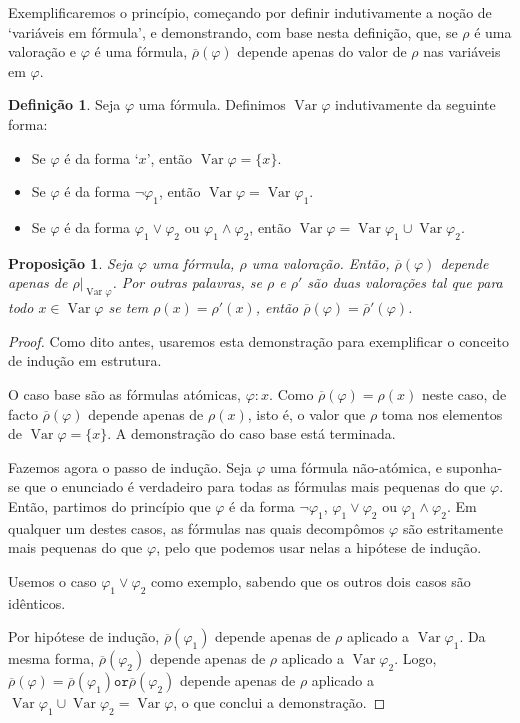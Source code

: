 \documentclass{report}
\newtheorem*{prop*}{Proposição}
\theoremstyle{definition}
\newtheorem*{definicao*}{Definição}
\theoremstyle{remark}
\DeclareMathOperator{\var}{Var}
\newcommand{\por}{\mathbin{\texttt{or}}}
\begin{document}
	Exemplificaremos o princípio, começando por definir indutivamente a noção de `variáveis em fórmula', e demonstrando, com base nesta definição, que, se $\rho$ é uma valoração e $\varphi$ é uma fórmula, $\overline\rho(\varphi)$ depende apenas do valor de $\rho$ nas variáveis em $\varphi$.
	
	\begin{definicao*}
	Seja $\varphi$ uma fórmula. Definimos $\var \varphi$ indutivamente da seguinte forma:
	\begin{itemize}
	\item Se $\varphi$ é da forma `$x$', então $\var \varphi = \{x\}$.
	
	\item Se $\varphi$ é da forma $\neg \varphi_1$, então $\var \varphi = \var \varphi_1$.
	
	\item Se $\varphi$ é da forma $\varphi_1 \lor \varphi_2$ ou $\varphi_1 \land \varphi_2$, então $\var \varphi = \var \varphi_1 \cup \var \varphi_2$.
	\end{itemize}
	\end{definicao*}
	
	\begin{prop*}
	Seja $\varphi$ uma fórmula, $\rho$ uma valoração. Então, $\overline \rho(\varphi)$ depende apenas de $\rho|_{\var \varphi}$. Por outras palavras, se $\rho$ e $\rho'$ são duas valorações tal que para todo $x \in \var \varphi$ se tem $\rho(x) = \rho'(x)$, então $\overline \rho(\varphi) = \overline \rho'(\varphi)$.
	\end{prop*}
	
	\begin{proof}
	Como dito antes, usaremos esta demonstração para exemplificar o conceito de indução em estrutura.
	
	O caso base são as fórmulas atómicas, $\varphi : x$. Como $\overline\rho(\varphi) = \rho(x)$ neste caso, de facto $\overline\rho(\varphi)$ depende apenas de $\rho(x)$, isto é, o valor que $\rho$ toma nos elementos de $\var \varphi = \{x\}$. A demonstração do caso base está terminada.
	
	Fazemos agora o passo de indução. Seja $\varphi$ uma fórmula não-atómica, e suponha-se que o enunciado é verdadeiro para todas as fórmulas mais pequenas do que $\varphi$. Então, partimos do princípio que $\varphi$ é da forma $\neg \varphi_1$, $\varphi_1 \lor \varphi_2$ ou $\varphi_1 \land \varphi_2$. Em qualquer um destes casos, as fórmulas nas quais decompômos $\varphi$ são estritamente mais pequenas do que $\varphi$, pelo que podemos usar nelas a hipótese de indução.
	
	Usemos o caso $\varphi_1 \lor \varphi_2$ como exemplo, sabendo que os outros dois casos são idênticos.
	
	Por hipótese de indução, $\overline\rho(\varphi_1)$ depende apenas de $\rho$ aplicado a $\var \varphi_1$. Da mesma forma, $\overline\rho(\varphi_2)$ depende apenas de $\rho$ aplicado a $\var \varphi_2$. Logo, $\overline\rho(\varphi) = \overline\rho(\varphi_1) \por \overline\rho(\varphi_2)$ depende apenas de $\rho$ aplicado a $\var \varphi_1 \cup \var \varphi_2 = \var \varphi$, o que conclui a demonstração.
	\end{proof}
	
\end{document}

